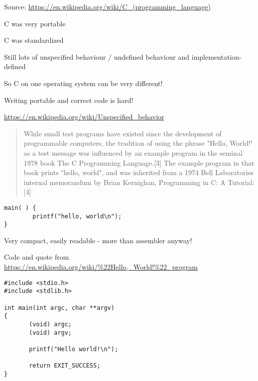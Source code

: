 \documentclass[Screen16to9,17pt]{foils}
\begin{document}
Source:
\url{https://en.wikipedia.org/wiki/C_(programming_language)}



\begin{list2}
\item C was very portable
\item C was standardized
\item Still lots of unspecified behaviour / undefined behaviour and implementation-defined
\item So C on one operating system can be very different!
\item Writing portable and correct code is hard!
\end{list2}

\url{https://en.wikipedia.org/wiki/Unspecified_behavior}





\begin{quote}
While small test programs have existed since the development of programmable computers, the tradition of using the phrase "Hello, World!" as a test message was influenced by an example program in the seminal 1978 book The C Programming Language.[3] The example program in that book prints "hello, world", and was inherited from a 1974 Bell Laboratories internal memorandum by Brian Kernighan, Programming in C: A Tutorial:[4]
\end{quote}

\begin{verbatim}
main( ) {
        printf("hello, world\n");
}
\end{verbatim}

\begin{list2}
\item Very compact, easily readable - more than assembler anyway!
\end{list2}

Code and quote from
\url{https://en.wikipedia.org/wiki/%22Hello,_World!%22_program}


\begin{verbatim}
#include <stdio.h>
#include <stdlib.h>

int main(int argc, char **argv)
{
       (void) argc;
       (void) argv;

       printf("Hello world!\n");

       return EXIT_SUCCESS;
}
\end{verbatim}
\end{document}
